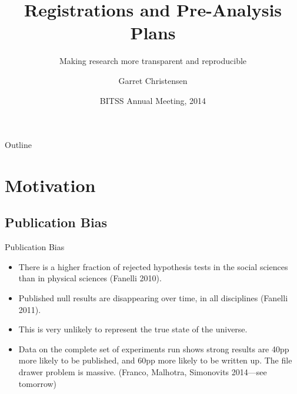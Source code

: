 \documentclass{beamer}
\title[Registrations and Pre-Analysis Plans] %
{Registrations and Pre-Analysis Plans}
\subtitle
{Making research more transparent and reproducible}
\author[Author, Another] %
{Garret Christensen\inst{1}}
\institute[Universities of Somewhere and Elsewhere] %
{
  \inst{1}%
  Berkeley Initiative for Transparency in the Social Sciences\\
  University of California Berkeley\\
  and\\
  Center for Open Science
}
\date %
{BITSS Annual Meeting, 2014}
\begin{document}
\begin{frame}
  \titlepage
\end{frame}

\begin{frame}{Outline}
  \tableofcontents
\end{frame}





\section{Motivation}

\subsection{Publication Bias}
\begin{frame}{Publication Bias}%
  \begin{itemize}
  \item
  There is a higher fraction of rejected hypothesis tests in the social sciences than in physical sciences (Fanelli 2010).
  \item
  	Published null results are disappearing over time, in all disciplines (Fanelli 2011). 
  \item
    This is very unlikely to represent the true state of the universe.
  \item
  	Data on the complete set of experiments run shows strong results are 40pp more likely to be published, and 60pp more likely to be written up. The file drawer problem is massive. (Franco, Malhotra, Simonovits 2014---see tomorrow)
  \end{itemize}
\end{frame}
\end{document}

